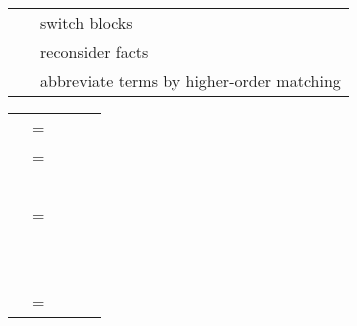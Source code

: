 \begin{isabellebody}
\begin{isamarkuptext}
\begin{tabular}{ll}
    \hyperlink{command.next}{\mbox{\isa{\isacommand{next}}}} & switch blocks \\
    \hyperlink{command.note}{\mbox{\isa{\isacommand{note}}}}~\isa{{\isachardoublequote}a\ {\isacharequal}\ b{\isachardoublequote}} & reconsider facts \\
    \hyperlink{command.let}{\mbox{\isa{\isacommand{let}}}}~\isa{{\isachardoublequote}p\ {\isacharequal}\ t{\isachardoublequote}} & abbreviate terms by higher-order matching \\
  \end{tabular}

  \medskip

  \begin{tabular}{rcl}
    \isa{{\isachardoublequote}theory{\isasymdash}stmt{\isachardoublequote}} & = & \hyperlink{command.theorem}{\mbox{\isa{\isacommand{theorem}}}}~\isa{{\isachardoublequote}name{\isacharcolon}\ props\ proof\ \ {\isacharbar}{\isachardoublequote}}~~\hyperlink{command.definition}{\mbox{\isa{\isacommand{definition}}}}~\isa{{\isachardoublequote}{\isasymdots}\ \ {\isacharbar}\ \ {\isasymdots}{\isachardoublequote}} \\[1ex]
    \isa{{\isachardoublequote}proof{\isachardoublequote}} & = & \isa{{\isachardoublequote}prfx\isactrlsup {\isacharasterisk}{\isachardoublequote}}~\hyperlink{command.proof}{\mbox{\isa{\isacommand{proof}}}}~\isa{{\isachardoublequote}method\ stmt\isactrlsup {\isacharasterisk}{\isachardoublequote}}~\hyperlink{command.qed}{\mbox{\isa{\isacommand{qed}}}}~\isa{method} \\
    & \isa{{\isachardoublequote}{\isacharbar}{\isachardoublequote}} & \isa{{\isachardoublequote}prfx\isactrlsup {\isacharasterisk}{\isachardoublequote}}~\hyperlink{command.done}{\mbox{\isa{\isacommand{done}}}} \\[1ex]
    \isa{prfx} & = & \hyperlink{command.apply}{\mbox{\isa{\isacommand{apply}}}}~\isa{method} \\
    & \isa{{\isachardoublequote}{\isacharbar}{\isachardoublequote}} & \hyperlink{command.using}{\mbox{\isa{\isacommand{using}}}}~\isa{{\isachardoublequote}facts{\isachardoublequote}} \\
    & \isa{{\isachardoublequote}{\isacharbar}{\isachardoublequote}} & \hyperlink{command.unfolding}{\mbox{\isa{\isacommand{unfolding}}}}~\isa{{\isachardoublequote}facts{\isachardoublequote}} \\
    \isa{stmt} & = & \hyperlink{command.braceleft}{\mbox{\isa{\isacommand{{\isacharbraceleft}}}}}~\isa{{\isachardoublequote}stmt\isactrlsup {\isacharasterisk}{\isachardoublequote}}~\hyperlink{command.braceright}{\mbox{\isa{\isacommand{{\isacharbraceright}}}}} \\

\end{tabular}
\end{isamarkuptext}
\end{isabellebody}
